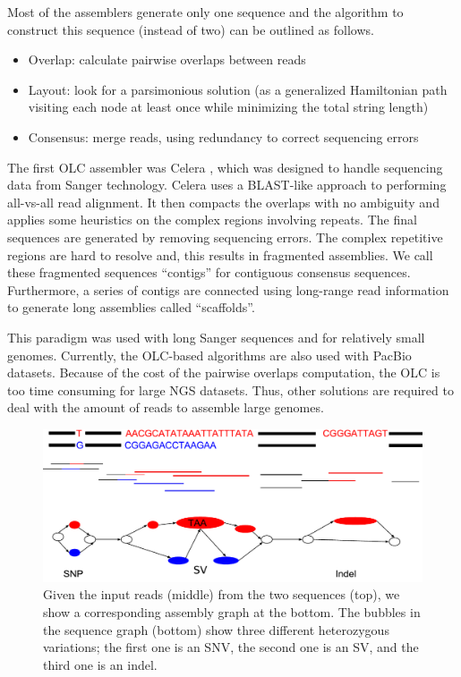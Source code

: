 Most of the assemblers generate only one sequence and the algorithm to construct this sequence (instead of two) can be outlined as follows.
\begin{itemize}
 \item Overlap: calculate pairwise overlaps between reads
 \item  Layout: look for a parsimonious solution (as a generalized Hamiltonian path visiting each node at least once while minimizing the total string length)
 \item  Consensus: merge reads, using redundancy to correct sequencing errors
\end{itemize}

The first OLC assembler was Celera \citep{myers2000whole}, which was designed to handle sequencing data from Sanger technology.
Celera uses a BLAST-like approach to performing all-vs-all read alignment. It then compacts the overlaps with no ambiguity and applies some heuristics on the complex regions involving repeats. The final sequences
are generated by removing sequencing errors. The complex repetitive regions are hard to resolve and, this results in fragmented assemblies.  We call these fragmented sequences
``contigs'' for contiguous consensus sequences. Furthermore, a series of contigs are connected using long-range read information to generate long assemblies called ``scaffolds''.

This paradigm was used with long Sanger sequences and for relatively small
genomes. Currently, the OLC-based algorithms are also used with PacBio datasets. 
Because of the cost of the pairwise overlaps computation, the OLC is too time
consuming for large NGS datasets. Thus, other solutions are required to deal with the amount of reads to assemble large genomes.
\bigskip

\begin{figure}[t!]\centering
\includegraphics[width=\columnwidth]{ex_sv.pdf}
\caption{Given the input reads (middle) from the two sequences (top), we show a corresponding assembly graph at the bottom.
The bubbles in the sequence graph (bottom) show three different heterozygous variations; the first one is an SNV, the second one is an SV, and the third one is an indel. }
\label{fig:ex_sv}
\end{figure}

